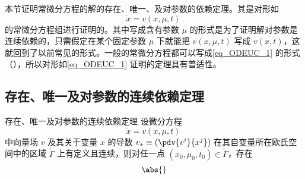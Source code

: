 
本节证明常微分方程的解的存在、唯一、及对参数的依赖定理。其是对形如
\begin{equation}\label{eq_ODEUC_1}
\dot x=v(x,\mu,t)~
\end{equation}
的常微分方程组进行证明的。其中写成含有参数 $\mu$ 的形式是为了证明解对参数是连续依赖的，只需假定在某个固定参数 $\mu$ 下就能把 $v(x,\mu,t)$ 写成 $v(x,t)$，这就回到了以前常见的形式。一般的常微分方程都可以写成\autoref{eq_ODEUC_1} 的形式（），所以对形如\autoref{eq_ODEUC_1} 证明的定理具有普适性。
\subsection{存在、唯一及对参数的连续依赖定理}
\begin{theorem}{存在、唯一及对参数的连续依赖定理}
设微分方程
\begin{equation}
\dot x=v(x,\mu,t)~
\end{equation}
中向量场 $v$ 及其关于变量 $x$ 的导数 $v_*\equiv(\pdv{v^i}{x^j})$ 在其自变量所在欧氏空间中的区域 $\tilde\Gamma$ 上有定义且连续，则对任一点 $(x_0,\mu_0,t_0)\in\tilde\Gamma$，存在
\begin{equation}
\abs{}
\end{equation}

\end{theorem}
